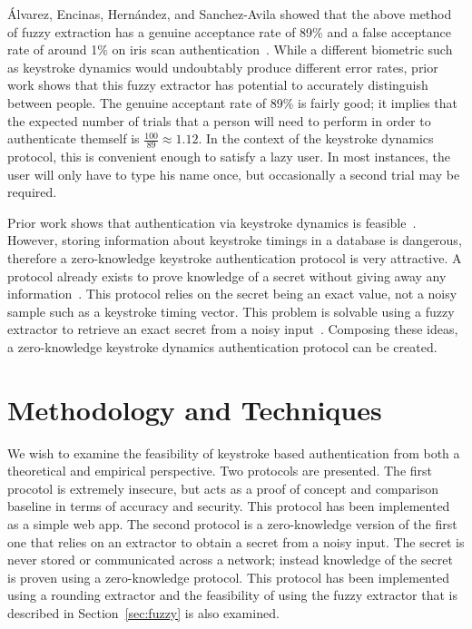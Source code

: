 \documentclass[11pt]{article}
\begin{document}
\'Alvarez, Encinas, Hern\'andez, and Sanchez-Avila showed that the above method of fuzzy extraction has a genuine acceptance rate of 89\% and a false acceptance rate of around 1\% on iris scan authentication~\cite{conf/csreaSAM/AlvarezEA09}. While a different biometric such as keystroke dynamics would undoubtably produce different error rates, prior work shows that this fuzzy extractor has potential to accurately distinguish between people. The genuine acceptant rate of 89\% is fairly good; it implies that the expected number of trials that a person will need to perform in order to authenticate themself is $\frac{100}{89}\approx 1.12$. In the context of the keystroke dynamics protocol, this is convenient enough to satisfy a lazy user. In most instances, the user will only have to type his name once, but occasionally a second trial may be required.

Prior work shows that authentication via keystroke dynamics is feasible~\cite{monrose:authentication}. However, storing information about keystroke timings in a database is dangerous, therefore a zero-knowledge keystroke authentication protocol is very attractive. A protocol already exists to prove knowledge of a secret without giving away any information~\cite{crypto-1986-1125}. This protocol relies on the secret being an exact value, not a noisy sample such as a keystroke timing vector. This problem is solvable using a fuzzy extractor to retrieve an exact secret from a noisy input~\cite{conf/csreaSAM/AlvarezEA09}. Composing these ideas, a zero-knowledge keystroke dynamics authentication protocol can be created.

\section{Methodology and Techniques}
\label{sec:methods}

We wish to examine the feasibility of keystroke based authentication from both a theoretical and empirical perspective. Two protocols are presented. The first procotol is extremely insecure, but acts as a proof of concept and comparison baseline in terms of accuracy and security. This protocol has been implemented as a simple web app. The second protocol is a zero-knowledge version of the first one that relies on an extractor to obtain a secret from a noisy input. The secret is never stored or communicated across a network; instead knowledge of the secret is proven using a zero-knowledge protocol. This protocol has been implemented using a rounding extractor and the feasibility of using the fuzzy extractor that is described in Section~\ref{sec:fuzzy} is also examined.
\end{document}
